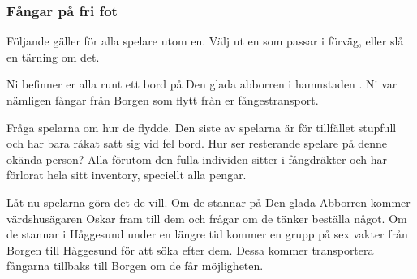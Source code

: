 \subsubsection{Fångar på fri fot}
Följande gäller för alla spelare utom en. Välj ut en som passar i förväg, eller slå en tärning om det.
\begin{displayquote}
	Ni befinner er alla runt ett bord på Den glada abborren i hamnstaden \sectiondescribe{\ref{haggesund:denGladaAbborren}}. Ni var nämligen fångar från Borgen \sectiondescribe{\ref{borgen}} som flytt från er fångestransport.
\end{displayquote}
Fråga spelarna om hur de flydde. Den siste av spelarna är för tillfället stupfull och har bara råkat satt sig vid fel bord. Hur ser resterande spelare på denne okända person? Alla förutom den fulla individen sitter i fångdräkter och har förlorat hela sitt inventory, speciellt alla pengar.

Låt nu spelarna göra det de vill. Om de stannar på Den glada Abborren kommer värdshusägaren Oskar fram till dem och frågar om de tänker beställa något. Om de stannar i Håggesund under en längre tid kommer en grupp på sex vakter från Borgen till Håggesund för att söka efter dem. Dessa kommer transportera fångarna tillbaks till Borgen om de får möjligheten.